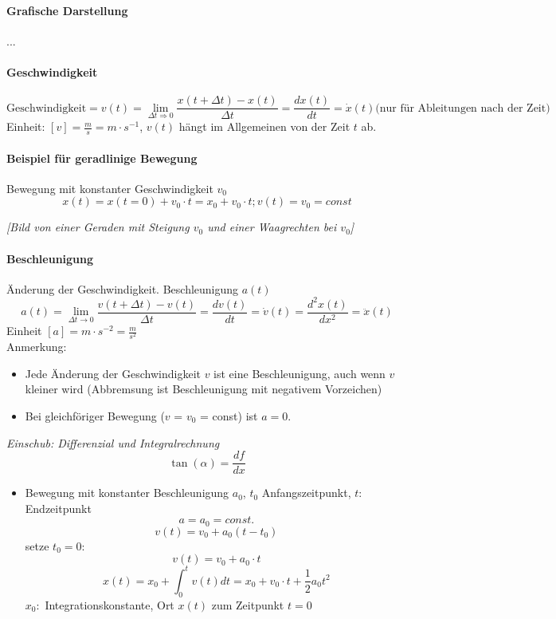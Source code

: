 \documentclass[a4paper,10pt, fleqn]{article}
\begin{document}
\paragraph{Grafische Darstellung}
...

\paragraph{Geschwindigkeit}

\[
  \text{Geschwindigkeit} = v(t) = \lim_{\Delta t \Rightarrow 0} \frac{x(t + \Delta t) - x(t)}{\Delta t}
  = \frac{dx(t)}{dt} = \dot{x}(t) \text{(nur für Ableitungen nach der Zeit)}
\]
Einheit: $[v] = \frac{m}{s} = m\cdot s^{-1}$, $v(t)$ hängt im Allgemeinen von der Zeit $t$ ab.

\paragraph{Beispiel für geradlinige Bewegung}

Bewegung mit konstanter Geschwindigkeit $v_{0}$
$$x(t) = x(t = 0) + v_{0} \cdot t = x_{0} + v_{0} \cdot t; v(t) = v_{0} = const$$

\textit{[Bild von einer Geraden mit Steigung $v_{0}$ und einer Waagrechten bei $v_{0}$]}

\paragraph{Beschleunigung}

Änderung der Geschwindigkeit. Beschleunigung $a(t)$
$$a(t) = \lim_{\Delta t \rightarrow 0}\frac{v(t + \Delta t) - v(t)}{\Delta t} = \frac{dv(t)}{dt} = \dot{v}(t) = \frac{d^{2}x(t)}{dx^{2}} = \ddot{x}(t)$$
Einheit $[a] = m\cdot s^{-2} = \frac{m}{s^{2}}$ \\
Anmerkung:
\begin{itemize}
\item Jede Änderung der Geschwindigkeit $v$ ist eine Beschleunigung,
  auch wenn $v$ kleiner wird (Abbremsung ist Beschleunigung mit
  negativem Vorzeichen)
\item Bei gleichföriger Bewegung ($v$ = $v_{0}$ = const) ist $a = 0$.
\end{itemize}

\textit{Einschub: Differenzial und Integralrechnung}
$$\tan(\alpha) = \frac{df}{dx}$$

\begin{itemize}
\item Bewegung mit konstanter Beschleunigung $a_{0}$, $t_{0}$ Anfangszeitpunkt, $t$: Endzeitpunkt
  $$a = a_{0} = const.$$
  $$v(t) = v_{0} + a_{0}(t-t_{0})$$
  setze $t_{0} = 0$:
  $$v(t) = v_{0} + a_{0} \cdot t$$
  $$x(t) = x_{0} + \int_{0}^{t}v(t)dt = x_{0} + v_{0} \cdot t + \frac{1}{2}a_{0}t^{2}$$
  $x_{0}:$ Integrationskonstante, Ort $x(t)$ zum Zeitpunkt $t = 0$
\end{itemize}
\end{document}

